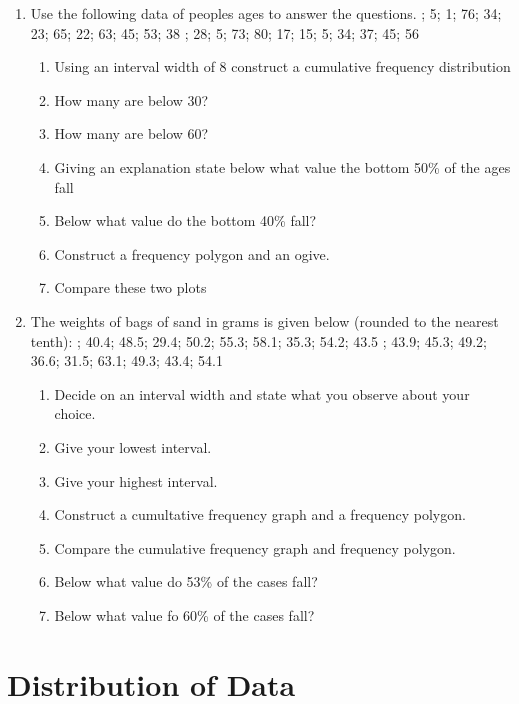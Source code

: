 {
\begin{enumerate}
\item Use the following data of peoples ages to answer the questions. ; 5; 1; 76; 34; 23; 65; 22; 63; 45; 53; 38 ; 28; 5; 73; 80; 17; 15; 5; 34; 37; 45; 56 
	\begin{enumerate}
	\item Using an interval width of 8 construct a cumulative frequency distribution 
	\item How many are below 30?
	\item How many are below 60?
	\item Giving an explanation state below what value the bottom 50\% of the ages fall
	\item Below what value do the bottom 40\% fall?
	\item Construct a frequency polygon and an ogive. 
	\item Compare these two plots
	\end{enumerate}
\item The weights of bags of sand in grams is given below (rounded to the nearest tenth): ; 40.4; 48.5; 29.4; 50.2; 55.3; 58.1; 35.3; 54.2; 43.5 ; 43.9; 45.3; 49.2; 36.6; 31.5; 63.1; 49.3; 43.4; 54.1 
	\begin{enumerate}
	\item Decide on an interval width and state what you observe about your choice.
	\item Give your lowest interval. 
	\item Give your highest interval.
	\item Construct a cumultative frequency graph and a frequency polygon.
	\item Compare the cumulative frequency graph and frequency polygon.
	\item Below what value do 53\% of the cases fall?
	\item Below what value fo 60\% of the cases fall?
	\end{enumerate}
\end{enumerate}
}

\section{Distribution of Data}

